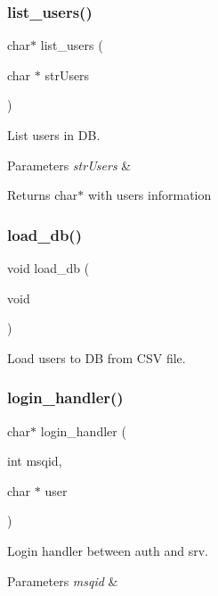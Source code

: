 \subsubsection{list\+\_\+users()}
{\footnotesize\ttfamily char$\ast$ list\+\_\+users (\begin{DoxyParamCaption}\item[{char $\ast$}]{str\+Users }\end{DoxyParamCaption})}



List users in DB. 


\begin{DoxyParams}{Parameters}
{\em str\+Users} & \\
\hline
\end{DoxyParams}
\begin{DoxyReturn}{Returns}
char$\ast$ with users information 
\end{DoxyReturn}
\mbox{\label{auth_8c_aca138a298c612a14d6fb2c16672f8c87}} 
\subsubsection{load\+\_\+db()}
{\footnotesize\ttfamily void load\+\_\+db (\begin{DoxyParamCaption}\item[{void}]{ }\end{DoxyParamCaption})}



Load users to DB from C\+SV file. 

\mbox{\label{auth_8c_adac4679e3a9744c45353d68b35bd1aba}} 
\subsubsection{login\+\_\+handler()}
{\footnotesize\ttfamily char$\ast$ login\+\_\+handler (\begin{DoxyParamCaption}\item[{int}]{msqid,  }\item[{char $\ast$}]{user }\end{DoxyParamCaption})}



Login handler between auth and srv. 


\begin{DoxyParams}{Parameters}
{\em msqid} & \\
\hline
\end{DoxyParams}
\mbox{\label{auth_8c_a840291bc02cba5474a4cb46a9b9566fe}} 
